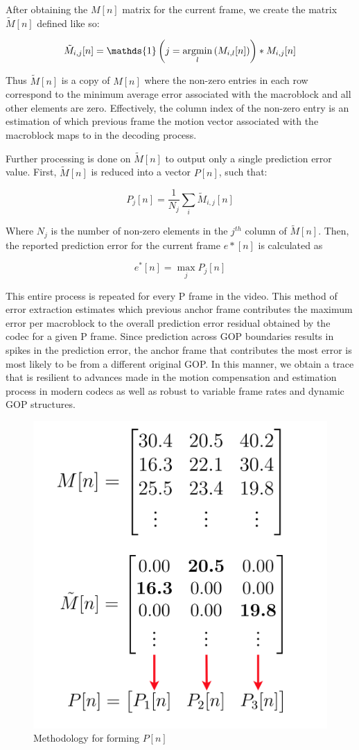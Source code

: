After obtaining the $M[n]$ matrix for the current frame, we create the matrix $\tilde{M}[n]$ defined like so:

\begin{equation}
  \tilde{M}_{i, j}[n] = \mathds{1} \left(j = \argmin_{l} \left( M_{i, l}[n] \right) \right) * M_{i, j}[n]
\end{equation}

Thus $\tilde{M}[n]$ is a copy of $M[n]$ where the non-zero entries in each row correspond to the minimum average error associated with the macroblock and all other elements are zero. Effectively, the column index of the non-zero entry is an estimation of which previous frame the motion vector associated with the macroblock maps to in the decoding process.

Further processing is done on $\tilde{M}[n]$ to output only a single prediction error value. First, $\tilde{M}[n]$ is reduced into a vector $P[n]$, such that:

\begin{equation}
  P_{j}[n] = \frac{1}{N_{j}} \sum_{i}{\tilde{M}_{i,j}[n]}
\end{equation}

Where $N_{j}$ is the number of non-zero elements in the $j^{th}$ column of $\tilde{M}[n]$. Then, the reported prediction error for the current frame $e*[n]$ is calculated as

\begin{equation}
  e^{*}[n] = \max_{j} P_{j}[n]
\end{equation}

This entire process is repeated for every P frame in the video. This method of error extraction estimates which previous anchor frame contributes the maximum error per macroblock to the overall prediction error residual obtained by the codec for a given P frame. Since prediction across GOP boundaries results in spikes in the prediction error, the anchor frame that contributes the most error is most likely to be from a different original GOP. In this manner, we obtain a trace that is resilient to advances made in the motion compensation and estimation process in modern codecs as well as robust to variable frame rates and dynamic GOP structures.

\begin{figure}[htbp]
\centerline{\includegraphics[width=0.55\linewidth]{ProposedApproach/formation_p_vector.png}}
\caption{Methodology for forming $P[n]$}
\label{formp}
\end{figure}

